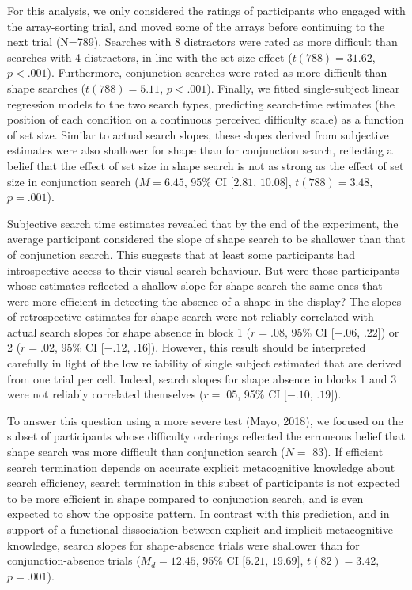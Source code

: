 \documentclass[
  english,
  man]{apa6}
\begin{document}
For this analysis, we only considered the ratings of participants who engaged with the array-sorting trial, and moved some of the arrays before continuing to the next trial (N=789). Searches with 8 distractors were rated as more difficult than searches with 4 distractors, in line with the set-size effect (\(t(788) = 31.62\), \(p < .001\)). Furthermore, conjunction searches were rated as more difficult than shape searches (\(t(788) = 5.11\), \(p < .001\)). Finally, we fitted single-subject linear regression models to the two search types, predicting search-time estimates (the position of each condition on a continuous perceived difficulty scale) as a function of set size. Similar to actual search slopes, these slopes derived from subjective estimates were also shallower for shape than for conjunction search, reflecting a belief that the effect of set size in shape search is not as strong as the effect of set size in conjunction search (\(M = 6.45\), 95\% CI \([2.81\), \(10.08]\), \(t(788) = 3.48\), \(p = .001\)).

Subjective search time estimates revealed that by the end of the experiment, the average participant considered the slope of shape search to be shallower than that of conjunction search. This suggests that at least some participants had introspective access to their visual search behaviour. But were those participants whose estimates reflected a shallow slope for shape search the same ones that were more efficient in detecting the absence of a shape in the display? The slopes of retrospective estimates for shape search were not reliably correlated with actual search slopes for shape absence in block 1 (\(r = .08\), 95\% CI \([-.06\), \(.22]\)) or 2 (\(r = .02\), 95\% CI \([-.12\), \(.16]\)). However, this result should be interpreted carefully in light of the low reliability of single subject estimated that are derived from one trial per cell. Indeed, search slopes for shape absence in blocks 1 and 3 were not reliably correlated themselves (\(r = .05\), 95\% CI \([-.10\), \(.19]\)).

To answer this question using a more severe test (Mayo, 2018), we focused on the subset of participants whose difficulty orderings reflected the erroneous belief that shape search was more difficult than conjunction search (\(N=\) 83). If efficient search termination depends on accurate explicit metacognitive knowledge about search efficiency, search termination in this subset of participants is not expected to be more efficient in shape compared to conjunction search, and is even expected to show the opposite pattern. In contrast with this prediction, and in support of a functional dissociation between explicit and implicit metacognitive knowledge, search slopes for shape-absence trials were shallower than for conjunction-absence trials (\(M_d = 12.45\), 95\% CI \([5.21\), \(19.69]\), \(t(82) = 3.42\), \(p = .001\)).
\end{document}
